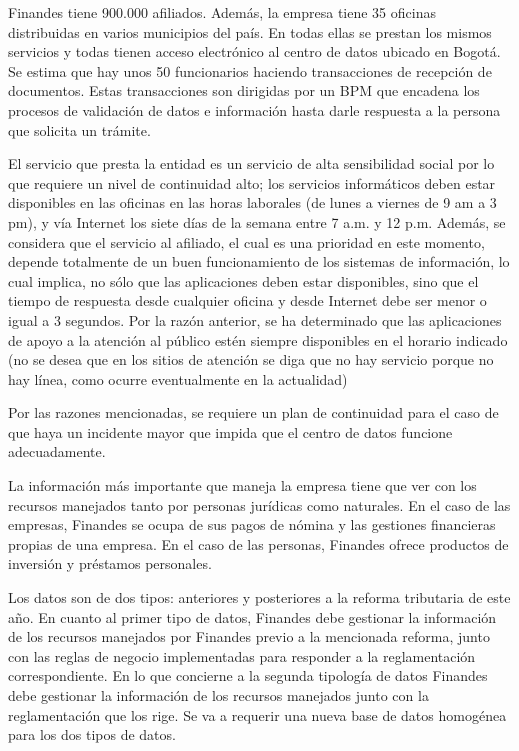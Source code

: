 \documentclass[a4paper]{article}
\begin{document}
Finandes tiene 900.000 afiliados. Además, la empresa tiene 35 oficinas distribuidas en varios municipios del país.
En todas ellas se prestan los mismos servicios y todas tienen acceso electrónico al centro de datos ubicado en
Bogotá. Se estima que hay unos 50 funcionarios haciendo transacciones de recepción de documentos. Estas
transacciones son dirigidas por un BPM que encadena los procesos de validación de datos e información hasta darle
respuesta a la persona que solicita un trámite.

El servicio que presta la entidad es un servicio de alta sensibilidad social por lo que requiere un nivel de continuidad
alto; los servicios informáticos deben estar disponibles en las oficinas en las horas laborales (de lunes a viernes de
9 am a 3 pm), y vía Internet los siete días de la semana entre 7 a.m. y 12 p.m. Además, se considera que el servicio
al afiliado, el cual es una prioridad en este momento, depende totalmente de un buen funcionamiento de los
sistemas de información, lo cual implica, no sólo que las aplicaciones deben estar disponibles, sino que el tiempo
de respuesta desde cualquier oficina y desde Internet debe ser menor o igual a 3 segundos. Por la razón anterior,
se ha determinado que las aplicaciones de apoyo a la atención al público estén siempre disponibles en el horario
indicado (no se desea que en los sitios de atención se diga que no hay servicio porque no hay línea, como ocurre
eventualmente en la actualidad)

Por las razones mencionadas, se requiere un plan de continuidad para el caso de que haya un incidente mayor que
impida que el centro de datos funcione adecuadamente.

La información más importante que maneja la empresa tiene que ver con los recursos manejados tanto por
personas jurídicas como naturales. En el caso de las empresas, Finandes se ocupa de sus pagos de nómina y las
gestiones financieras propias de una empresa. En el caso de las personas, Finandes ofrece productos de inversión y
préstamos personales.

Los datos son de dos tipos: anteriores y posteriores a la reforma tributaria de este año. En cuanto al primer tipo de
datos, Finandes debe gestionar la información de los recursos manejados por Finandes previo a la mencionada
reforma, junto con las reglas de negocio implementadas para responder a la reglamentación correspondiente. En
lo que concierne a la segunda tipología de datos Finandes debe gestionar la información de los recursos manejados
junto con la reglamentación que los rige. Se va a requerir una nueva base de datos homogénea para los dos tipos
de datos.
\end{document}
